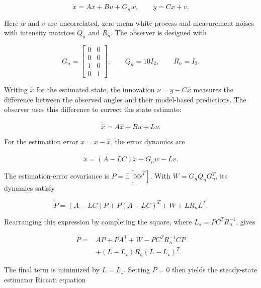 \documentclass[conference]{IEEEtran}
\begin{document}
\begin{equation}
\dot x=Ax+Bu+G_nw,\qquad y=Cx+v.
\label{eq:noise_model}
\end{equation}

Here $w$ and $v$ are uncorrelated, zero-mean white process and measurement noises with intensity matrices $Q_n$ and $R_n$. The observer is designed with

\begin{equation}
G_n=\begin{bmatrix}0&0\\0&0\\1&0\\0&1\end{bmatrix},\qquad
Q_n=10I_2,\qquad R_n=I_2.
\label{eq:noisew}
\end{equation}

Writing $\hat x$ for the estimated state, the innovation $\nu=y-C\hat x$ measures the difference between the observed angles and their model-based predictions. The observer uses this difference to correct the state estimate:

\begin{equation}
\dot{\hat x}=A\hat x+Bu +L\nu.
\label{eq:observer}
\end{equation}

For the estimation error $\tilde x=x-\hat x$, the error dynamics are

\begin{equation}
\dot{\tilde x}=(A-LC)\tilde x+G_nw-Lv.
\label{eq:esterror}
\end{equation}

The estimation-error covariance is $P=\mathbb E[\tilde x\tilde x^T]$. With $W=G_nQ_nG_n^T$, its dynamics satisfy

\begin{equation}
\dot P=(A-LC)P+P(A-LC)^T+W+LR_nL^T.
\label{eq:covariance}
\end{equation}

Rearranging this expression by completing the square, where $L_\star=PC^TR_n^{-1}$, gives

\begin{equation}
\begin{split}
\dot P={}&AP+PA^T+W-PC^TR_n^{-1}CP\\
&+(L-L_\star)R_n(L-L_\star)^T.
\end{split}
\label{eq:covsquare}
\end{equation}

The final term is minimized by $L=L_\star$. Setting $\dot P=0$ then yields the steady-state estimator Riccati equation
\end{document}
